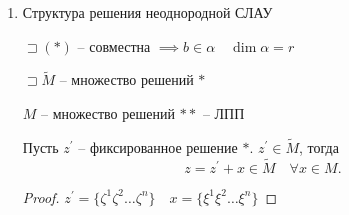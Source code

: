 \documentclass{book}
\newcommand\R{\ensuremath{\mathbb{R}}}
\newcommand{\p}[1]{#1^{\prime}}
\newcommand{\tl}[1]{\widetilde{#1}}
\theoremstyle{definition}
\begin{document}
\begin{enumerate}
\begin{proof}
             $\lambda y = \sum_{k=r+1}^{n} \lambda \eta^ka_k = \lambda \sum_{k=r+1}^{n} \eta^ka_k \longleftrightarrow \lambda \sum_{k=1}^{n} \xi^ka_k$
         \end{proof}

         Доказали, что $M$ -- ЛП размерности  $n-r$

         $M\simeq \R^{n-r} \leftarrow $ базис $\begin{cases}
             \left( 1, 0, \ldots, 0 \right) ^T\\
             (0,1,\ldots,1)^T\
             \ldots\\
             (0,0,\ldots,1)^T\\
         \end{cases}$ 

         $(100\ldots_0)\in \R^{n-r}\quad \left( \xi_1^1 \xi_1^2\ldots\xi_1^r;100\ldots 0 \right) $

         $(0100\ldots_0)\in \R^{n-r} \longleftrightarrow \left( \xi_2^1\xi_2^2\ldots \xi_2^r;010\ldots 0 \right) $

         $\ldots$

         $(000\ldots_1) \leftrightarrow \left( \xi_{n-r}^1 \xi_{n-r}^2 \ldots \xi_{n-r}^r;00\ldots 1 \right) $ 

         Справа стоит базис $M$. Нормальная ФСР  ($* *$)

         $\sqsupset \left( \xi_j^1\xi_j^2\ldots\xi_j^r,00\ldots 1..0 \right) = x_j $ 

         \begin{definition}
             Общим решением системы $* *$ называется решение вида  \[
                 x = c_1x_1+c_2x_2+\ldots+c_{n-r}x_{n-r} = \sum_{i=1}^{n-r} c_ix_i
             .\]  
         \end{definition}
         
     \item Структура решения неоднородной СЛАУ

     $\sqsupset (*)$ -- совместна $\implies b\in \mathscr{\alpha}\quad \dim \mathscr{\alpha} = r$

     $\sqsupset \tl M $ -- множество решений $*$

      $M$ -- множество решений  $* *$ -- ЛПП

       \begin{theorem}
          Пусть $\p z$ -- фиксированное решение  $*$.  $\p z\in \tl M$, тогда  \[
          z = \p z+x\in \tl M\quad \forall x\in M
          .\] 
      \end{theorem}
      \begin{proof}
          $\p z = \{\zeta^1\zeta^2 \ldots \zeta^n\}\quad x = \{\xi^1\xi^2 \ldots \xi^n\}$


\end{proof}
\end{enumerate}
\end{document}
